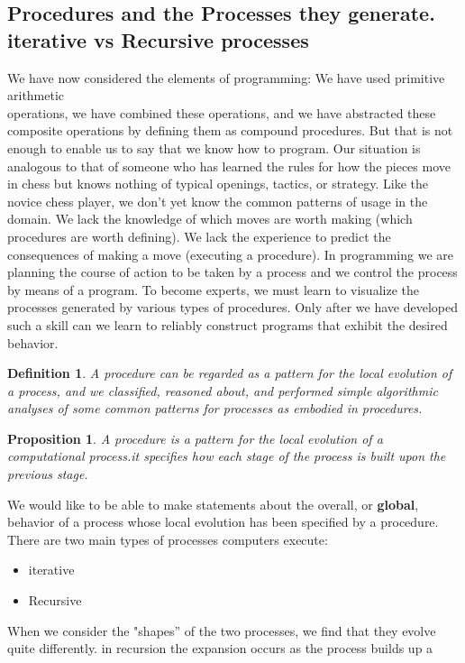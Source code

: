 \documentclass[a4paper,twoside]{article}
\newtheorem{proposition}[theorem]{Proposition}
\newtheorem{definition}[theorem]{Definition}
\numberwithin{equation}{section}
\begin{document}
\subsection{Procedures and the Processes they generate. iterative vs Recursive processes}
We have now considered the elements of programming: We have used primitive arithmetic \\
operations, we have combined these operations, and we have abstracted these composite operations by
defining them as compound procedures. But that is not enough to enable us to say that we know how to program. Our situation is analogous to that of someone who has
learned the rules for how the pieces move in chess but knows nothing of typical openings, tactics,
or strategy. Like the novice chess player, we don't yet know the common patterns of usage in the
domain. We lack the knowledge of which moves are worth making (which procedures are worth defining).
 We lack the experience to predict the consequences of making a move (executing a procedure).
 In programming we are planning the course of action to be taken by a process and
we control the process by means of a program. To become experts, we must learn to visualize the
processes generated by
various types of procedures.
Only after we have developed such a skill can we learn to reliably construct programs that exhibit
the desired behavior.
\begin{definition}
    A procedure can be regarded as a pattern for the local evolution of a process, and we classified,
    reasoned about, and performed simple algorithmic analyses of some common patterns for processes
    as embodied in procedures.
\end{definition}
\begin{proposition}
    A procedure is a pattern for the local evolution of a computational process.it specifies how each
    stage of the process is built upon the previous stage.
\end{proposition}
We would like to be able to make statements about the overall, or \textbf{global}, behavior of a
process whose local evolution has been specified
by a procedure. There are two main types of processes computers execute:
\begin{itemize}
    \item iterative
    \item Recursive
\end{itemize}
When we consider the "shapes” of the two processes, we
find that they evolve quite differently. in recursion the expansion occurs as the process builds up a
\end{document}
